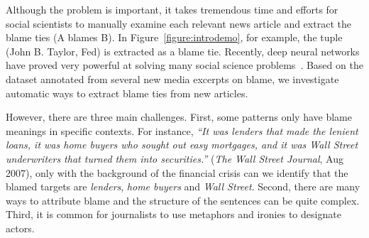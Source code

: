\documentclass[letterpaper]{article} %
\begin{document}
Although the problem is important, it takes tremendous time and efforts for social scientists to manually examine each relevant news article and extract the blame ties (A blames B). In Figure~\ref{figure:introdemo}, for example, the tuple (John B. Taylor, Fed) is extracted as a blame tie. Recently, deep neural networks have proved very powerful at solving many social science problems~\cite{li-hovy:2014:EMNLP20141,rule2015lexical,bail2016combining}. Based on the dataset annotated from several new media excerpts on blame, we investigate automatic ways to extract blame ties from new articles.

However, there are three main challenges. First, some patterns only have blame meanings in specific contexts. For instance, {\it ``It was lenders that made the lenient loans, it was home buyers who sought out easy mortgages, and it was Wall Street underwriters that turned them into securities.''} ({\it The Wall Street Journal}, Aug 2007), only with the background of the financial crisis can we identify that the blamed targets are {\it lenders}, {\it home buyers} and {\it Wall Street}. Second, there are many ways to attribute blame and the structure of the sentences can be quite complex. Third, it is common for journalists to use metaphors and ironies to designate actors.
\end{document}
